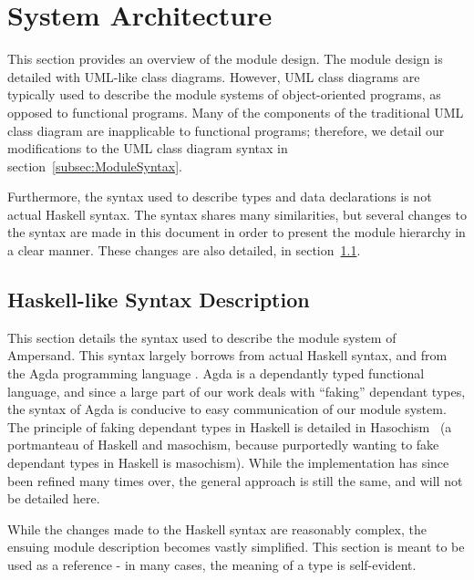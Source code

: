 \documentclass[12pt, svgnames]{article}
\let\Oldsubsection\subsection
\renewcommand{\subsection}{\FloatBarrier\Oldsubsection}
\begin{document}
\newpage
\section{System Architecture} \label{SystemArch}

This section provides an overview of the module design. The module design is
detailed with UML-like class diagrams. However, UML class diagrams are typically
used to describe the module systems of object-oriented programs, as opposed to
functional programs. Many of the components of the traditional UML class
diagram are inapplicable to functional programs; therefore, we detail our
modifications to the UML class diagram syntax in section~\ref{subsec:ModuleSyntax}. 

Furthermore, the syntax used to describe types and data declarations is not
actual Haskell syntax. The syntax shares many similarities, but several changes
to the syntax are made in this document in order to present the module hierarchy
in a clear manner. These changes are also detailed, in section~\ref{subsec:HaskellSyntax}. 


\subsection{Haskell-like Syntax Description}\label{subsec:HaskellSyntax}

This section details the syntax used to describe the module system of
Ampersand. This syntax largely borrows from actual Haskell syntax, and from the
Agda programming language \cite{agda}. Agda is a dependantly typed functional
language, and since a large part of our work deals with ``faking'' dependant
types, the syntax of Agda is conducive to easy communication of our module system. The
principle of faking dependant types in Haskell is detailed in
Hasochism~\cite{hasochism} (a portmanteau of Haskell and masochism, because
purportedly wanting to fake dependant types in Haskell is masochism). While the
implementation has since been refined many times over, the general approach is still the
same, and will not be detailed here.

While the changes made to the Haskell syntax are reasonably complex, the ensuing 
module description becomes vastly simplified. This section is meant to be used
as a reference - in many cases, the meaning of a type is self-evident. 
\end{document}
